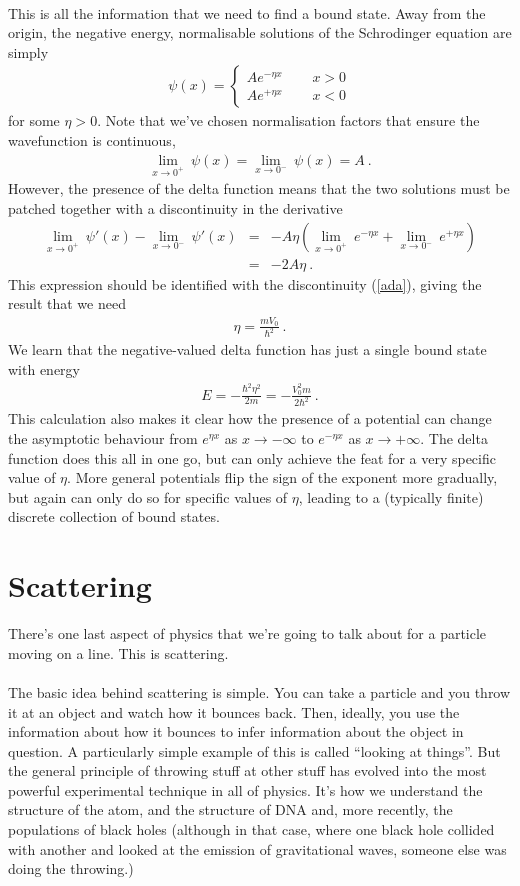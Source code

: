 \documentclass[12pt]{article}
\def\be{\begin{eqnarray}}
\def\ee{\end{eqnarray}}
\newcommand{\nn}{\nonumber}
\newcommand\para{\paragraph{}}
\newcommand{\eqn}[1]{(\ref{#1})}
\begin{document}
{\para
This is all the information that we need to find a bound state. Away from the origin, the negative energy, normalisable solutions of the Schrodinger equation are simply
%
%
\be \psi(x) = \left\{\begin{array}{cc} A e^{-\eta x}\ \ \ &\ \ \ {x>0}\\Ae^{+\eta x}\ \ \ & \ \ \ x<0\end{array}\right.\ee
%
for some $\eta >0$. Note that we've chosen normalisation factors that ensure the wavefunction is continuous,
%
\be \lim_{x\rightarrow 0^+}\ \psi(x) = \lim_{x\rightarrow 0^-}\ \psi(x) = A\ .\ee
%
However, the presence of the delta function means that the two solutions must be patched together with a discontinuity in the derivative
%
\be\lim_{x\rightarrow 0^+}\ \psi'(x) -\lim_{x\rightarrow 0^-}\ \psi'(x)  &=& -A\eta \left(\lim_{x\rightarrow 0^+}\ e^{-\eta x} + \lim_{x\rightarrow 0^-}\ e^{+\eta x}\right)\nn\\ &=& -2A\eta 
\ .\ee
%
This expression should be identified with the discontinuity \eqn{ada}, giving the result that we need
%
\be \eta = \frac{mV_0}{\hbar^2}\ .\ee
%
We learn that the negative-valued delta function has just a single bound state with energy
%
\be E = -\frac{\hbar^2\eta^2}{2m}  = -\frac{V_0^2m}{2\hbar^2}\ .\label{1ddeltabound}\ee
%
This calculation also makes it clear how the presence of a potential can change the asymptotic behaviour from $e^{\eta x}$ as $x\rightarrow-\infty$ to $e^{-\eta x}$ as $x\rightarrow +\infty$. The delta function does this all in one go, but can only achieve the feat for a very specific value of $\eta$. More general potentials flip the sign of the exponent more gradually, but again can only do so for specific values of $\eta$, leading to a (typically finite) discrete collection of bound states.}


\newpage
\section{Scattering}


There's one last aspect of physics that we're going to talk about for a particle moving on a line. This is scattering.

\para
The basic idea behind scattering is simple. You can take a particle and you throw it at an object and watch how it bounces back. Then, ideally, you use the information about how it bounces to infer information about the object in question.  A particularly simple example of this is called ``looking at things''. But the general principle of throwing stuff at other stuff has evolved into the most powerful experimental technique in all of physics. It's how we understand the structure of the atom, and the structure of DNA and, more recently, the populations of black holes (although in that case, where one black hole collided with another and looked at the emission of gravitational waves, someone else was doing the throwing.)
\end{document}
